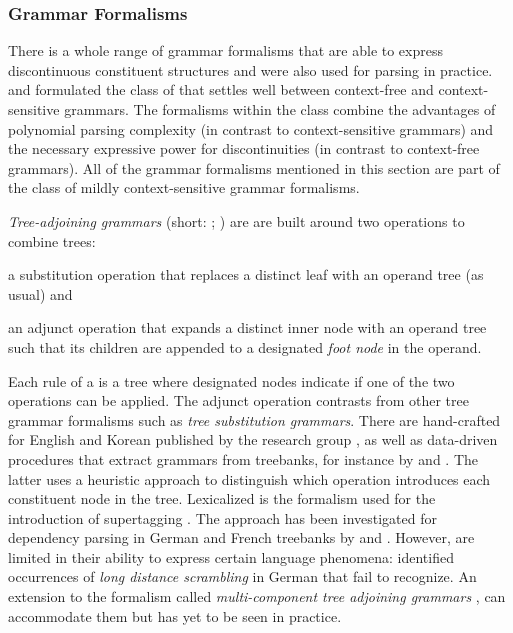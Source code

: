 \documentclass[../document.tex]{subfiles}
\begin{document}
    \subsubsection*{Grammar Formalisms}
    There is a whole range of grammar formalisms that are able to express discontinuous constituent structures and were also used for parsing in practice.
     and \citet{Weir88} formulated the class of  that settles well between context-free and context-sensitive grammars.
    The formalisms within the class combine the advantages of polynomial parsing complexity (in contrast to context-sensitive grammars) and the necessary expressive power for discontinuities (in contrast to context-free grammars).
    All of the grammar formalisms mentioned in this section are part of the class of mildly context-sensitive grammar formalisms.

    \emph{Tree-adjoining grammars} (short: ; \citealp{JosLevTak75}) are are built around two operations to combine trees:
    \begin{compactitem}
        \item a substitution operation that replaces a distinct leaf with an operand tree (as usual) and
        \item an adjunct operation that expands a distinct inner node with an operand tree such that its children are appended to a designated \emph{foot node} in the operand.
    \end{compactitem}
    Each rule of a  is a tree where designated nodes indicate if one of the two operations can be applied.
    The adjunct operation contrasts  from other tree grammar formalisms such as \emph{tree substitution grammars}.
    There are hand-crafted  for English \citep{xtag01} and Korean \citep{xtag02} published by the  research group \citep{Doran99}, as well as data-driven procedures that extract grammars from treebanks, for instance by \citet{xia1999extracting} and \citet{Bla18}.
    The latter uses a heuristic approach to distinguish which operation introduces each constituent node in the tree.
    Lexicalized  is the formalism used for the introduction of supertagging \citep{bangalore1999supertagging}.
    The approach has been investigated for dependency parsing in German and French treebanks by \citet{Kas17} and \citet{Bla18}.
    However,  are limited in their ability to express certain language phenomena: \citet{Becker91} identified occurrences of \emph{long distance scrambling} in German that  fail to recognize.
    An extension to the formalism called \emph{multi-component tree adjoining grammars} \citep{VijWeiJos87,Weir88}, can accommodate them but has yet to be seen in practice.
\end{document}
